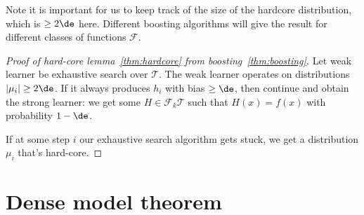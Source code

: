 Note it is important for us to keep track of the size of the hardcore distribution, which is $\ge 2\de$ here.
Different boosting algorithms will give the result for different classes of functions $\mathcal F$.

\begin{proof}[Proof of hard-core lemma~\ref{thm:hardcore} from boosting~\ref{thm:boosting}]
Let weak learner be exhaustive search over $\mathcal T$. The weak learner operates on distributions $|\mu_i|\ge 2\de$. If it always produces $h_i$ with bias $\ge \de$, then continue  and obtain the strong learner: we get some $H\in \mathcal F_k \mathcal T$ such that  $H(x)=f(x)$ with probability $1-\de$. 

If at some step $i$ our exhaustive search algorithm gets stuck, we get a distribution $\mu_i$ that's hard-core.
\end{proof}




\section{Dense model theorem}

